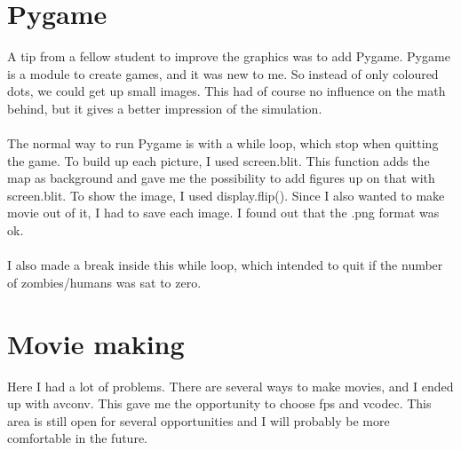 \documentclass[11pt]{article}
\begin{document}
\section*{Pygame}
A tip from a fellow student to improve the graphics was to add Pygame. Pygame is a module to create games, and it was new to me. So instead of only coloured dots, we could get up small images. This had of course no influence on the math behind, but it gives a better impression of the simulation. 
\\
\\
The normal way to run Pygame is with a while loop, which stop when quitting the game. To build up each picture, I used screen.blit. This function adds the map as background and gave me the possibility to add figures up on that with screen.blit. To show the image, I used display.flip(). Since I also wanted to make movie out of it, I had to save each image. I found out that the .png format was ok.
\\
\\
I also made a break inside this while loop, which intended to quit if the number of zombies/humans was sat to zero.

\section*{Movie making}
Here I had a lot of problems. There are several ways to make movies, and I ended up with avconv. This gave me the opportunity to choose fps and vcodec. This area is still open for several opportunities and I will probably be more comfortable in the future. 
\end{document}
